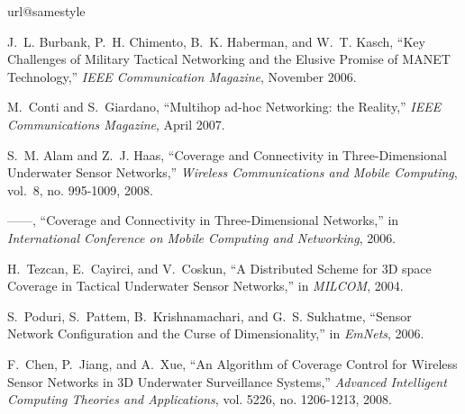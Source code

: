 \documentclass[10pt]{IEEEtran}
\begin{document}

\begin{thebibliography}{10}
\providecommand{\url}[1]{#1}
\csname url@samestyle\endcsname
\providecommand{\newblock}{\relax}
\providecommand{\bibinfo}[2]{#2}
\providecommand{\BIBentrySTDinterwordspacing}{\spaceskip=0pt\relax}
\providecommand{\BIBentryALTinterwordstretchfactor}{4}
\providecommand{\BIBentryALTinterwordspacing}{\spaceskip=\fontdimen2\font plus
\BIBentryALTinterwordstretchfactor\fontdimen3\font minus
  \fontdimen4\font\relax}
\providecommand{\BIBforeignlanguage}[2]{{\expandafter\ifx\csname l@#1\endcsname\relax
\typeout{** WARNING: IEEEtran.bst: No hyphenation pattern has been}\typeout{** loaded for the language `#1'. Using the pattern for}\typeout{** the default language instead.}\else
\language=\csname l@#1\endcsname
\fi
#2}}
\providecommand{\BIBdecl}{\relax}
\BIBdecl

J.~L. Burbank, P.~H. Chimento, B.~K. Haberman, and W.~T. Kasch, ``Key
  {C}hallenges of {M}ilitary {T}actical {N}etworking and the {E}lusive
  {P}romise of {M}{A}{N}{E}{T} {T}echnology,'' \emph{IEEE Communication
  Magazine}, November 2006.

M.~Conti and S.~Giardano, ``Multihop ad-hoc {N}etworking: the {R}eality,''
  \emph{IEEE Communications Magazine}, April 2007.

S.~M. Alam and Z.~J. Haas, ``Coverage and {C}onnectivity in
  {T}hree-{D}imensional {U}nderwater {S}ensor {N}etworks,'' \emph{Wireless
  Communications and Mobile Computing}, vol.~8, no. 995-1009, 2008.

------, ``Coverage and {C}onnectivity in {T}hree-{D}imensional {N}etworks,'' in
  \emph{International Conference on Mobile Computing and Networking}, 2006.

H.~Tezcan, E.~Cayirci, and V.~Coskun, ``A {D}istributed {S}cheme for 3{D} space
  {C}overage in {T}actical {U}nderwater {S}ensor {N}etworks,'' in
  \emph{MILCOM}, 2004.

S.~Poduri, S.~Pattem, B.~Krishnamachari, and G.~S. Sukhatme, ``Sensor {N}etwork
  {C}onfiguration and the {C}urse of {D}imensionality,'' in \emph{EmNets},
  2006.

F.~Chen, P.~Jiang, and A.~Xue, ``An {A}lgorithm of {C}overage {C}ontrol for
  {W}ireless {S}ensor {N}etworks in 3{D} {U}nderwater {S}urveillance
  {S}ystems,'' \emph{Advanced Intelligent Computing Theories and Applications},
  vol. 5226, no. 1206-1213, 2008.


\end{thebibliography}
\end{document}
